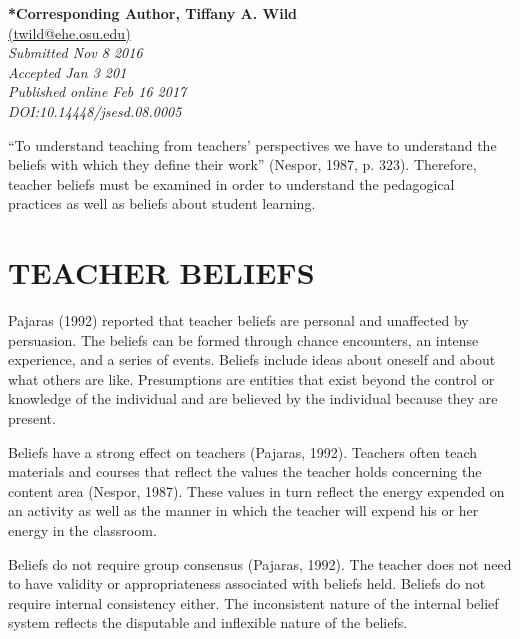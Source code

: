 \documentclass[11.5pt]{sig-alternate} %
\begin{document}
\textbf{*Corresponding Author, Tiffany A. Wild}\\
\href{mailto:twild@ehe.osu.edu}{(twild@ehe.osu.edu)} \\
\textit{Submitted Nov 8 2016 }\\
\textit{Accepted  Jan 3 201} \\
\textit{Published online Feb 16 2017} \\
\textit{DOI:10.14448/jsesd.08.0005} \\
\pagebreak
\clearpage
\begin{large}

“To understand teaching from teachers’ perspectives we have to understand the beliefs with which they define their work” (Nespor, 1987, p. 323).  Therefore, teacher beliefs must be examined in order to understand the pedagogical practices as well as beliefs about student learning.   

\section*{TEACHER BELIEFS}

Pajaras (1992) reported that teacher beliefs are personal and unaffected by persuasion.  The beliefs can be formed through chance encounters, an intense experience, and a series of events.  Beliefs include ideas about oneself and about what others are like.  Presumptions are entities that exist beyond the control or knowledge of the individual and are believed by the individual because they are present. 
	
 Beliefs have a strong effect on teachers (Pajaras, 1992).  Teachers often teach materials and courses that reflect the values the teacher holds concerning the content area (Nespor, 1987).  These values in turn reflect the energy expended on an activity as well as the manner in which the teacher will expend his or her energy in the classroom.  
	
 Beliefs do not require group consensus (Pajaras, 1992).  The teacher does not need to have validity or appropriateness associated with beliefs held.  Beliefs do not require internal consistency either.  The inconsistent nature of the internal belief system reflects the disputable and inflexible nature of the beliefs.
	

\end{large}
\end{document}
